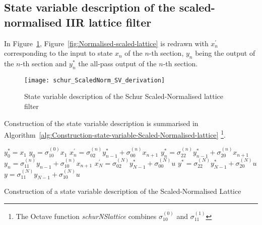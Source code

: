 \documentclass[a4paper,twoside,10pt,english]{report}
\begin{document}
\subsection{\label{State-Variable-Description-Scaled-Normalised-IIR-Lattice-Filter}State variable description of the scaled-normalised IIR lattice filter}
In Figure~\ref{fig:State-variable-description-Scaled-Normalised-lattice},
Figure~\ref{fig:Normalised-scaled-lattice} is redrawn with $x_{n}^{\prime}$
corresponding to the input to state $x_{n}$ of the $n$-th section,
$y_{n}$ being the output of the $n$-th section and $y_{n}^{*}$
the all-pass output of the $n$-th section.
\begin{figure}[!htbp]
\begin{center}
\texttt{[image: schur\_ScaledNorm\_SV\_derivation]}
\caption{State variable description of the Schur Scaled-Normalised lattice filter}
\label{fig:State-variable-description-Scaled-Normalised-lattice}
\end{center}
\end{figure}
Construction of the state variable description is summarised in 
Algorithm~\ref{alg:Construction-state-variable-Scaled-Normalised-lattice}
\footnote{The Octave function \emph{schurNSlattice} combines 
$\sigma_{10}^{\left(0\right)}$ and $\sigma_{11}^{\left(1\right)}$}.
\begin{algorithm}[!htbp]
\begin{algorithmic}
\State $y_{0}^{*} = x_{1}$
\State $y_{0} = \sigma_{10}^{\left(0\right)}x_{1}$
  \State $x_{n}^{\prime}=\sigma_{02}^{\left(n\right)}y_{n-1}^{*}+\sigma_{00}^{\left(n\right)}x_{n+1}$
  \State $y_{n}^{*}=\sigma_{22}^{\left(n\right)}y_{n-1}^{*}+\sigma_{20}^{\left(n\right)}x_{n+1}$
  \State $y_{n}=\sigma_{11}^{\left(n\right)}y_{n-1}+\sigma_{10}^{\left(n\right)}x_{n+1}$
\EndFor
\State $x_{N}^{\prime}=\sigma_{02}^{\left(N\right)}y_{N-1}^{*}+\sigma_{00}^{\left(N\right)}u$
\State $y^{*}=\sigma_{22}^{\left(N\right)}y_{N-1}^{*}+\sigma_{20}^{\left(N\right)}u$
\State $y=\sigma_{11}^{\left(N\right)}y_{N-1}+\sigma_{10}^{\left(N\right)}u$
\end{algorithmic}
\caption{Construction of a state variable description of the Scaled-Normalised Lattice}
\label{alg:Construction-state-variable-Scaled-Normalised-lattice}
\end{algorithm}
\end{document}
